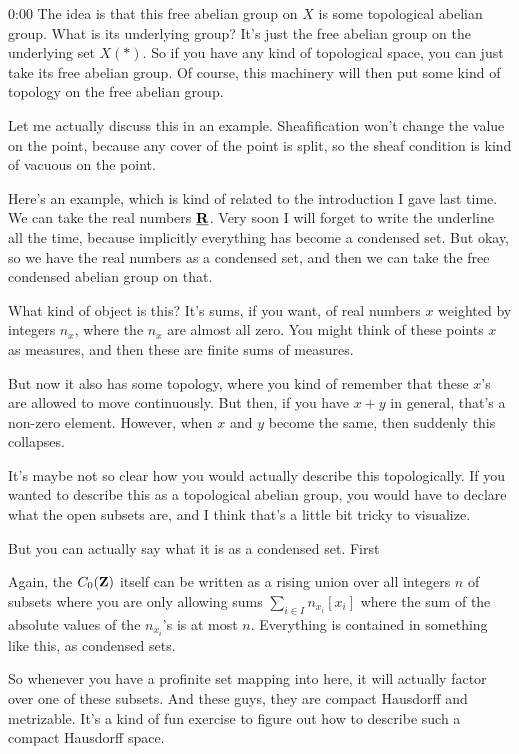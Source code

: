 \begin{unfinished}{0:00}
The idea is that this free abelian group on $X$ is some topological abelian group. What is its underlying group? It's just the free abelian group on the underlying set $X(\ast)$. So if you have any kind of topological space, you can just take its free abelian group. Of course, this machinery will then put some kind of topology on the free abelian group.

Let me actually discuss this in an example. Sheafification won't change the value on the point, because any cover of the point is split, so the sheaf condition is kind of vacuous on the point.

Here's an example, which is kind of related to the introduction I gave last time. We can take the real numbers $\underline{\mathbf R}$. Very soon I will forget to write the underline all the time, because implicitly everything has become a condensed set. But okay, so we have the real numbers as a condensed set, and then we can take the free condensed abelian group on that.

What kind of object is this? It's sums, if you want, of real numbers $x$ weighted by integers $n_x$, where the $n_x$ are almost all zero. You might think of these points $x$ as measures, and then these are finite sums of measures.

But now it also has some topology, where you kind of remember that these $x$'s are allowed to move continuously. But then, if you have $x + y$ in general, that's a non-zero element. However, when $x$ and $y$ become the same, then suddenly this collapses.

It's maybe not so clear how you would actually describe this topologically. If you wanted to describe this as a topological abelian group, you would have to declare what the open subsets are, and I think that's a little bit tricky to visualize.

But you can actually say what it is as a condensed set. First

Again, the $C_0(\mathbf Z)$ itself can be written as a rising union over all integers $n$ of subsets where you are only allowing sums $\sum_{i\in I} n_{x_i}[x_i]$ where the sum of the absolute values of the $n_{x_i}$'s is at most $n$. Everything is contained in something like this, as condensed sets.

So whenever you have a profinite set mapping into here, it will actually factor over one of these subsets. And these guys, they are compact Hausdorff and metrizable. It's a kind of fun exercise to figure out how to describe such a compact Hausdorff space.


\end{unfinished}
